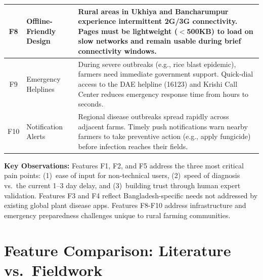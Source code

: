 \documentclass[12pt,a4paper]{article}
\begin{document}
\begin{longtable}{|c|L{3cm}|L{10.5cm}|}
\hline
F8 & Offline-Friendly Design & Rural areas in Ukhiya and Bancharumpur experience intermittent 2G/3G connectivity. Pages must be lightweight ($<$500KB) to load on slow networks and remain usable during brief connectivity windows. \\
\hline
F9 & Emergency Helplines & During severe outbreaks (e.g., rice blast epidemic), farmers need immediate government support. Quick-dial access to the DAE helpline (16123) and Krishi Call Center reduces emergency response time from hours to seconds. \\
\hline
F10 & Notification Alerts & Regional disease outbreaks spread rapidly across adjacent farms. Timely push notifications warn nearby farmers to take preventive action (e.g., apply fungicide) before infection reaches their fields. \\
\hline
\end{longtable}

\textbf{Key Observations:} Features F1, F2, and F5 address the three most critical pain points: (1)~ease of input for non-technical users, (2)~speed of diagnosis vs.\ the current 1--3 day delay, and (3)~building trust through human expert validation. Features F3 and F4 reflect Bangladesh-specific needs not addressed by existing global plant disease apps. Features F8-F10 address infrastructure and emergency preparedness challenges unique to rural farming communities.

\section{Feature Comparison: Literature vs.\ Fieldwork}
\end{document}
